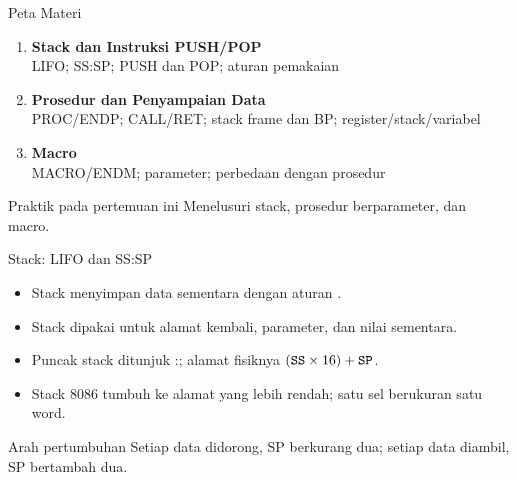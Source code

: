 \documentclass[aspectratio=169,11pt]{beamer}
\begin{document}
\begin{frame}{Peta Materi}
\small
\begin{enumerate}
    \item \textbf{Stack dan Instruksi PUSH/POP}\\
          {\footnotesize LIFO; SS:SP; PUSH dan POP; aturan
          pemakaian}

    \vspace{0.25em}
    \item \textbf{Prosedur dan Penyampaian Data}\\
          {\footnotesize PROC/ENDP; CALL/RET; stack frame dan BP;
          register/stack/variabel}

    \vspace{0.25em}
    \item \textbf{Macro}\\
          {\footnotesize MACRO/ENDM; parameter; perbedaan dengan
          prosedur}
\end{enumerate}

\vspace{0.35em}
\begin{block}{Praktik pada pertemuan ini}
\small Menelusuri stack, prosedur berparameter, dan macro.
\end{block}
\end{frame}


\begin{frame}{Stack: LIFO dan SS:SP}
\small
\begin{itemize}
    \item Stack menyimpan data sementara dengan aturan
          .

    \vspace{0.18em}
    \item Stack dipakai untuk alamat kembali, parameter, dan nilai
          sementara.

    \vspace{0.18em}
    \item Puncak stack ditunjuk :; alamat fisiknya
          $(\texttt{SS} \times 16) + \texttt{SP}$.

    \vspace{0.18em}
    \item Stack 8086 tumbuh ke alamat yang lebih rendah; satu sel
          berukuran satu word.
\end{itemize}

\vspace{0.2em}
\begin{block}{Arah pertumbuhan}
\small Setiap data didorong, SP berkurang dua; setiap data diambil,
SP bertambah dua.
\end{block}
\end{frame}
\end{document}
